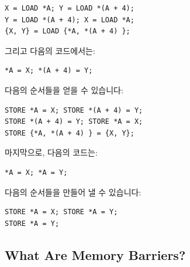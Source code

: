 \begin{enumerate}
\begin{enumerate}
\begin{minipage}[t]{\columnwidth}
\scriptsize
\begin{verbatim}
X = LOAD *A; Y = LOAD *(A + 4);
Y = LOAD *(A + 4); X = LOAD *A;
{X, Y} = LOAD {*A, *(A + 4) };
\end{verbatim}
\vspace{1pt}
\end{minipage}

	그리고 다음의 코드에서는:

\begin{minipage}[t]{\columnwidth}
\scriptsize
\begin{verbatim}
*A = X; *(A + 4) = Y;
\end{verbatim}
\end{minipage}

	다음의 순서들을 얻을 수 있습니다:

\begin{minipage}[t]{\columnwidth}
\scriptsize
\begin{verbatim}
STORE *A = X; STORE *(A + 4) = Y;
STORE *(A + 4) = Y; STORE *A = X;
STORE {*A, *(A + 4) } = {X, Y};
\end{verbatim}
\vspace{1pt}
\end{minipage}

	마지막으로, 다음의 코드는:

\begin{minipage}[t]{\columnwidth}
\scriptsize
\begin{verbatim}
*A = X; *A = Y;
\end{verbatim}
\end{minipage}

	다음의 순서들을 만들어 낼 수 있습니다:

\begin{minipage}[t]{\columnwidth}
\scriptsize
\begin{verbatim}
STORE *A = X; STORE *A = Y;
STORE *A = Y;
\end{verbatim}
\end{minipage}

\end{enumerate}

\subsection{What Are Memory Barriers?}
\label{sec:advsync:What Are Memory Barriers?}


\end{enumerate}
